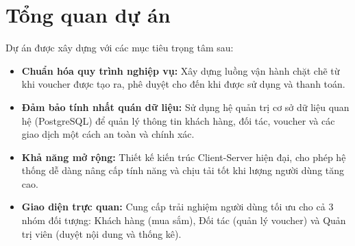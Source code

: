 \section{Tổng quan dự án}
Dự án được xây dựng với các mục tiêu trọng tâm sau:

\begin{itemize}
    \item \textbf{Chuẩn hóa quy trình nghiệp vụ:} Xây dựng luồng vận hành chặt chẽ từ khi voucher được tạo ra, phê duyệt cho đến khi được sử dụng và thanh toán.
    \item \textbf{Đảm bảo tính nhất quán dữ liệu:} Sử dụng hệ quản trị cơ sở dữ liệu quan hệ (PostgreSQL) để quản lý thông tin khách hàng, đối tác, voucher và các giao dịch một cách an toàn và chính xác.
    \item \textbf{Khả năng mở rộng:} Thiết kế kiến trúc Client-Server hiện đại, cho phép hệ thống dễ dàng nâng cấp tính năng và chịu tải tốt khi lượng người dùng tăng cao.
    \item \textbf{Giao diện trực quan:} Cung cấp trải nghiệm người dùng tối ưu cho cả 3 nhóm đối tượng: Khách hàng (mua sắm), Đối tác (quản lý voucher) và Quản trị viên (duyệt nội dung và thống kê).
\end{itemize}
